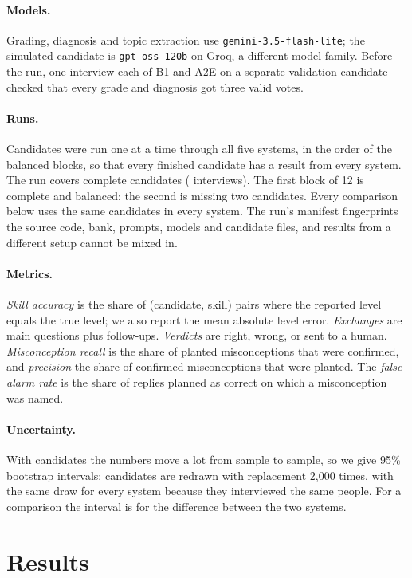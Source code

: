 \documentclass[10pt,a4paper]{article}
\begin{document}
\paragraph{Models.} Grading, diagnosis and topic extraction use \texttt{gemini-3.5-flash-lite}; the
simulated candidate is \texttt{gpt-oss-120b} on Groq, a different model family. Before the run, one
interview each of B1 and A2E on a separate validation candidate checked that every grade and
diagnosis got three valid votes.

\paragraph{Runs.} Candidates were run one at a time through all five systems, in the order of the
balanced blocks, so that every finished candidate has a result from every system. The run covers
\fN{} complete candidates (\fInterviews{} interviews). The first block of 12 is complete and
balanced; the second is missing two candidates. Every comparison below uses the
same \fN{} candidates in every system. The run's manifest fingerprints the source code, bank, prompts,
models and candidate files, and results from a different setup cannot be mixed in.

\paragraph{Metrics.} \emph{Skill accuracy} is the share of (candidate, skill) pairs where the
reported level equals the true level; we also report the mean absolute level error.
\emph{Exchanges} are main questions plus follow-ups. \emph{Verdicts} are right, wrong, or sent to a
human. \emph{Misconception recall} is the share of planted misconceptions that were confirmed, and
\emph{precision} the share of confirmed misconceptions that were planted. The \emph{false-alarm rate}
is the share of replies planned as correct on which a misconception was named.

\paragraph{Uncertainty.} With \fN{} candidates the numbers move a lot from sample to sample, so we
give 95\% bootstrap intervals: candidates are redrawn with replacement 2,000 times, with the same
draw for every system because they interviewed the same people. For a comparison the interval is
for the difference between the two systems.

\section{Results}
\label{sec:results}
\end{document}
